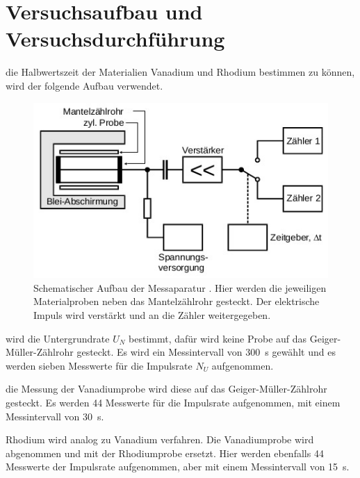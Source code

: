 
\section{Versuchsaufbau und Versuchsdurchführung}\justifying

    \justifying die Halbwertszeit der Materialien Vanadium und Rhodium bestimmen zu können, wird der folgende Aufbau verwendet.
    \begin{figure}
        \centering
        \includegraphics[width=\textwidth]{images/aufbau.jpg}
        \caption{Schematischer Aufbau der Messaparatur \cite{V702}. Hier werden die jeweiligen Materialproben neben das Mantelzählrohr gesteckt.
        Der elektrische Impuls wird verstärkt und an die Zähler weitergegeben.}
        \label{fig:3}
    \end{figure}
    \justifying wird die Untergrundrate $U_N$ bestimmt, dafür wird keine Probe auf das Geiger-Müller-Zählrohr gesteckt.
    Es wird ein Messintervall von \SI{300}{\second} gewählt und es werden sieben Messwerte für die Impulsrate $N_U$ aufgenommen.

    \justifying die Messung der Vanadiumprobe wird diese auf das Geiger-Müller-Zählrohr gesteckt. Es werden 44 Messwerte für die
    Impulsrate aufgenommen, mit einem Messintervall von \SI{30}{\second}. 

    \justifying Rhodium wird analog zu Vanadium verfahren. Die Vanadiumprobe wird abgenommen und mit der Rhodiumprobe ersetzt.
    Hier werden ebenfalls 44 Messwerte der Impulsrate aufgenommen, aber mit einem Messintervall von \SI{15}{\second}.

